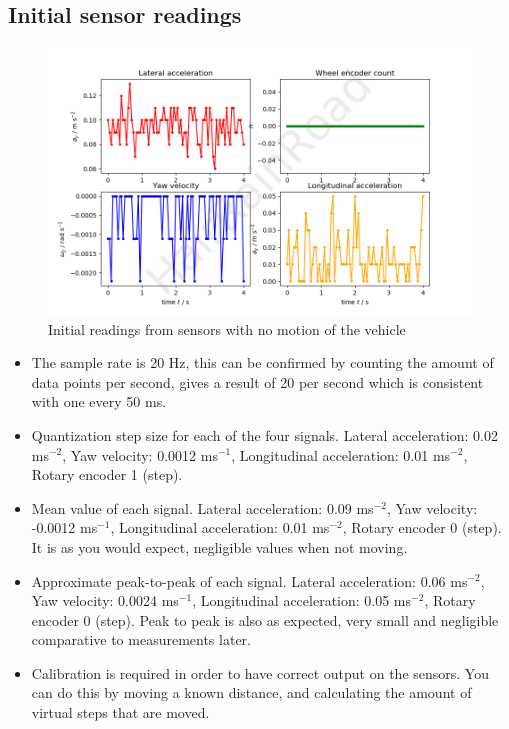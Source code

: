 \documentclass[12pt]{article}
\begin{document}
    \subsection{Initial sensor readings}
    \begin{figure}[H]
        \captionsetup{labelfont=bf}
        \includegraphics[width=40pc]{fig1png.png}
        \caption{Initial readings from sensors with no motion of the vehicle}\label{figure1}
    \end{figure}
    \begin{itemize}
        \item The sample rate is 20 Hz, this can be confirmed by counting the amount of data points per second, gives a result of 20 per 
        second which is consistent with one every 50 ms.
        \item Quantization step size for each of the four signals. Lateral acceleration: 0.02 ms$^{-2}$, Yaw velocity: 0.0012 ms$^{-1}$,
        Longitudinal acceleration: 0.01 ms$^{-2}$, Rotary encoder 1 (step).
        \item Mean value of each signal. Lateral acceleration: 0.09 ms$^{-2}$, Yaw velocity: -0.0012 ms$^{-1}$,
        Longitudinal acceleration: 0.01 ms$^{-2}$, Rotary encoder 0 (step). It is as you would expect, negligible values when not moving.
        \item Approximate peak-to-peak of each signal. Lateral acceleration: 0.06 ms$^{-2}$, Yaw velocity: 0.0024 ms$^{-1}$,
        Longitudinal acceleration: 0.05 ms$^{-2}$, Rotary encoder 0 (step). Peak to peak is also as expected, very small and negligible comparative to measurements later.
        \item Calibration is required in order to have correct output on the sensors. You can do this by moving a known distance, 
        and calculating the amount of virtual steps that are moved. 
    \end{itemize}
    \newpage
\end{document}
